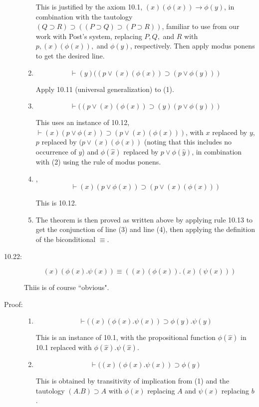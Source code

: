 \documentclass[12pt]{article}
\begin{document}
\begin{description}
\begin{enumerate}
This is justified by the axiom 10.1, $(x)(\phi(x)) \rightarrow \phi(y)$, in combination with the tautology $(Q \supset R) \supset ((P \supset Q) \supset (P \supset R))$, familiar to use from our work with Post's system, replacing $P, Q,$ and $R$ with $p, (x)(\phi(x)),$ and $\phi(y)$, respectively.  Then apply modus ponens to get the desired line.

\item $$\vdash (y)((p \vee (x)(\phi(x)) \supset (p \vee \phi(y)))$$

Apply 10.11 (universal generalization) to (1).

\item $$\vdash ((p \vee (x)(\phi(x)) \supset (y)(p \vee \phi(y)))$$

This uses an instance of 10.12, $\vdash (x)(p \vee \phi(x)) \supset (p \vee (x)(\phi(x)))$, with $x$ replaced by $y$, $p$ replaced by $(p \vee (x)(\phi(x))$ (noting that this includes no occurrence of $y$)
and $\phi(\hat{x})$ replaced by $p \vee \phi(\hat{y})$, in combination with (2) using the rule of modus ponens.

\item , $$\vdash (x)(p \vee \phi(x)) \supset (p \vee (x)(\phi(x)))$$

This is 10.12.

\item  The theorem is then proved as written above by applying rule 10.13 to get the conjunction of line (3) and line (4), then applying the definition of the biconditional $\equiv$.

\end{enumerate}

\item[10.22:]  $$(x)(\phi(x).\psi(x)) \equiv ((x)(\phi(x)).(x)(\psi(x)))$$

Thiis is of course ``obvious".

\item[Proof:]

\begin{enumerate}

\item $$\vdash ((x)(\phi(x).\psi(x)) \supset \phi(y).\psi(y)$$

This is an instance of 10.1, with the propositional function $\phi(\hat{x})$ in 10.1 replaced with $\phi(\hat{x}).\psi(\hat{x})$.

\item $$\vdash ((x)(\phi(x).\psi(x)) \supset \phi(y)$$

This is obtained by transitivity of implication from (1) and the tautology $(A.B) \supset A$ with $\phi(x)$ replacing $A$ and $\psi(x)$ replacing $b$.


\end{enumerate}
\end{description}
\end{document}
